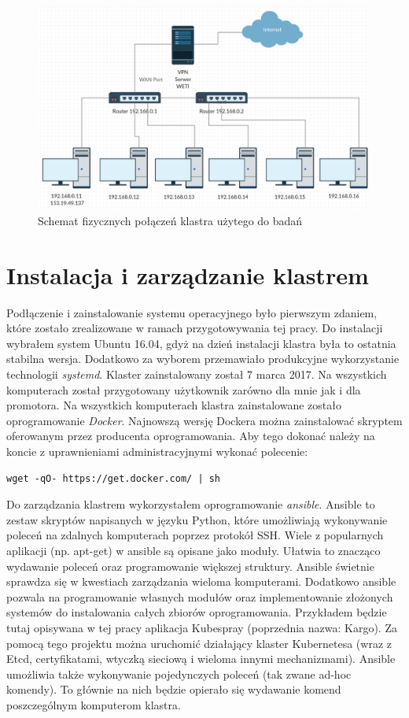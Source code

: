 \documentclass[10pt,a4paper,titlepage,twoside]{report}
\begin{document}
\begin{figure}[ht!]
	\centering
	\includegraphics[scale=0.4]{pics/cluster-architecture.png}
	\caption{Schemat fizycznych połączeń klastra użytego do badań}
	\label{cluster_architecture}
\end{figure}

\section{Instalacja i zarządzanie klastrem}

Podłączenie i zainstalowanie systemu operacyjnego było pierwszym zdaniem, które zostało zrealizowane w ramach przygotowywania tej pracy. Do instalacji wybrałem system Ubuntu 16.04, gdyż na dzień instalacji klastra była to ostatnia stabilna wersja. Dodatkowo za wyborem przemawiało produkcyjne wykorzystanie technologii \textit{systemd}. Klaster zainstalowany został 7 marca 2017. Na wszystkich komputerach został przygotowany użytkownik zarówno dla mnie jak i dla promotora. Na wszystkich komputerach klastra zainstalowane zostało oprogramowanie \textit{Docker}. Najnowszą wersję Dockera można zainstalować skryptem oferowanym przez producenta oprogramowania. Aby tego dokonać należy na koncie z uprawnieniami administracyjnymi wykonać polecenie:

\begin{lstlisting}
wget -qO- https://get.docker.com/ | sh
\end{lstlisting}

Do zarządzania klastrem wykorzystałem oprogramowanie \textit{ansible}. Ansible to zestaw skryptów napisanych w języku Python, które umożliwiają wykonywanie poleceń na zdalnych komputerach poprzez protokół SSH. Wiele z popularnych aplikacji (np. apt-get) w ansible są opisane jako moduły. Ułatwia to znacząco wydawanie poleceń oraz programowanie większej struktury. Ansible świetnie sprawdza się w kwestiach zarządzania wieloma komputerami. Dodatkowo ansible pozwala na programowanie własnych modułów oraz implementowanie złożonych systemów do instalowania całych zbiorów oprogramowania. Przykładem będzie tutaj opisywana w tej pracy aplikacja Kubespray (poprzednia nazwa: Kargo). Za pomocą tego projektu można uruchomić działający klaster Kubernetesa (wraz z Etcd, certyfikatami, wtyczką sieciową i wieloma innymi mechanizmami). Ansible umożliwia także wykonywanie pojedynczych poleceń (tak zwane ad-hoc komendy). To głównie na nich będzie opierało się wydawanie komend poszczególnym komputerom klastra. 
\end{document}
